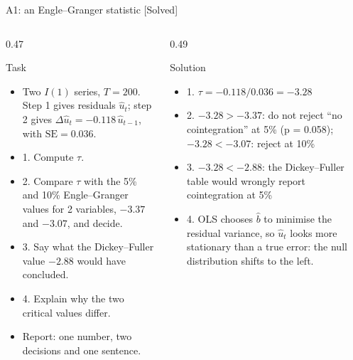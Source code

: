 \begin{frame}{A1: an Engle--Granger statistic [Solved]}
\itemsize{\scriptsize}
\begin{columns}[T]
\begin{column}{0.47\textwidth}
\begin{block}{Task}
\begin{itemize}
    \item Two $I(1)$ series, $T = 200$. Step 1 gives residuals $\hat u_t$; step 2 gives $\Delta\hat u_t = -0.118\,\hat u_{t-1}$, with $\mathrm{SE} = 0.036$.
    \item 1. Compute $\tau$.
    \item 2. Compare $\tau$ with the 5\% and 10\% Engle--Granger values for 2 variables, $-3.37$ and $-3.07$, and decide.
    \item 3. Say what the Dickey--Fuller value $-2.88$ would have concluded.
    \item 4. Explain why the two critical values differ.
    \item Report: one number, two decisions and one sentence.
\end{itemize}
\end{block}
\end{column}
\begin{column}{0.49\textwidth}
\begin{exampleblock}{Solution}
\begin{itemize}
    \item 1. $\tau = -0.118/0.036 = -3.28$
    \item 2. $-3.28 > -3.37$: do not reject ``no cointegration'' at 5\% (p = 0.058); $-3.28 < -3.07$: reject at 10\%
    \item 3. $-3.28 < -2.88$: the Dickey--Fuller table would wrongly report cointegration at 5\%
    \item 4. OLS chooses $\hat b$ to minimise the residual variance, so $\hat u_t$ looks more stationary than a true error: the null distribution shifts to the left.
\end{itemize}
\end{exampleblock}
\end{column}
\end{columns}
\end{frame}

